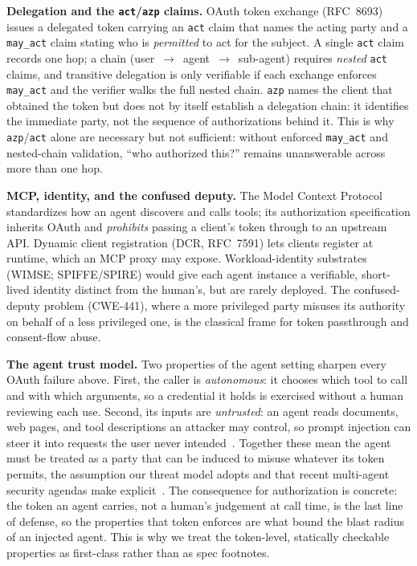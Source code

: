 \noindent\textbf{Delegation and the \texttt{act}/\texttt{azp} claims.} OAuth token
exchange (RFC~8693) issues a delegated token carrying an \texttt{act} claim that
names the acting party and a \texttt{may\_act} claim stating who is \emph{permitted}
to act for the subject. A single \texttt{act} claim records one hop; a chain
(user~$\rightarrow$~agent~$\rightarrow$~sub-agent) requires \emph{nested}
\texttt{act} claims, and transitive delegation is only verifiable if each exchange
enforces \texttt{may\_act} and the verifier walks the full nested chain. \texttt{azp}
names the client that obtained the token but does not by itself establish a
delegation chain: it identifies the immediate party, not the sequence of
authorizations behind it. This is why \texttt{azp}/\texttt{act} alone are necessary
but not sufficient: without enforced \texttt{may\_act} and nested-chain validation,
``who authorized this?'' remains unanswerable across more than one hop.

\noindent\textbf{MCP, identity, and the confused deputy.} The Model Context Protocol
standardizes how an agent discovers and calls tools; its authorization specification
inherits OAuth and \emph{prohibits} passing a client's token through to an upstream
API. Dynamic client registration (DCR, RFC~7591) lets clients register at runtime,
which an MCP proxy may expose. Workload-identity substrates (WIMSE; SPIFFE/SPIRE)
would give each agent instance a verifiable, short-lived identity distinct from the
human's, but are rarely deployed. The confused-deputy problem (CWE-441), where a more
privileged party misuses its authority on behalf of a less privileged one, is the
classical frame for token passthrough and consent-flow abuse.

\noindent\textbf{The agent trust model.} Two properties of the agent setting sharpen
every OAuth failure above. First, the caller is \emph{autonomous}: it chooses which
tool to call and with which arguments, so a credential it holds is exercised without a
human reviewing each use. Second, its inputs are \emph{untrusted}: an agent reads
documents, web pages, and tool descriptions an attacker may control, so prompt
injection can steer it into requests the user never intended~\cite{agentauth2023indirectpi}.
Together these mean the agent must be treated as a party that can be induced to misuse
whatever its token permits, the assumption our threat model adopts and that recent
multi-agent security agendas make explicit~\cite{agentauth2025multiagentchallenges}.
The consequence for authorization is concrete: the token an agent carries, not a
human's judgement at call time, is the last line of defense, so the properties that
token enforces are what bound the blast radius of an injected agent. This is why we
treat the token-level, statically checkable properties as first-class rather than as
spec footnotes.

